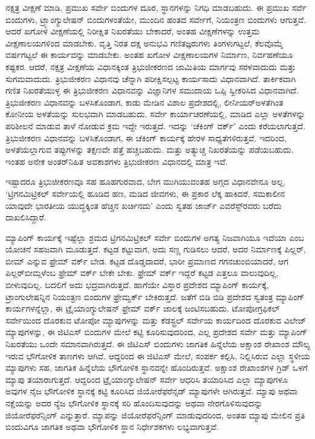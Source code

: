 ನಕ್ಷತ್ರ ವೀಕ್ಷಣೆ ಮಾಡಿ, ಪ್ರಮುಖ ಸರ್ವೇ ಬಿಂದುಗಳ ದೂರ, ಸ್ಥಾನಗಳನ್ನು ನಿಗಧಿ ಮಾಡಬಹುದು. ಈ ಪ್ರಮುಖ ಸರ್ವೆ ಬಿಂದುಗಳು, ಟ್ರ್ಯಾಂಗ್ಯುಲೇಷನ್​ ಬಿಂದುಗಳಂತೆಯೇ, ಮುಂದಿನ ಹಂತದ ಸರ್ವೇಗೆ, ನಿಯಂತ್ರಣ ಬಿಂದುಗಳು ಆಗುತ್ತವೆ. ಆದರೆ ಖಗೋಳ ವೀಕ್ಷಣೆಯಲ್ಲಿ ನಿರೀಕ್ಷಿತ ನಿಖರತೆಯು ಬೇಕಾದರೆ, ಅಂತಹ ವೀಕ್ಷಣೆಗಳನ್ನು ಉತ್ತಮ ವೀಕ್ಷಣಾಲಯಗಳಿಂದ ಮಾಡಬೇಕು. ವೃತ್ತಿ ನಿರತ ದಕ್ಷ ಅನುಭವಿ ಗಣಿತಜ್ಞರುಗಳು ತಿಂಗಳುಗಟ್ಟಲೆ, ಕೆಲವೊಮ್ಮೆ ವರ್ಷಗಟ್ಟಲೆ ಈ ಕಾರ್ಯವನ್ನು ಮಾಡಬೇಕು. ಅಂತಹ ಖಗೋಳ ವೀಕ್ಷಣಾಲಯಗಳ ನಿರ್ಮಾಣ, ನಿರ್ವಹಣೆಯೂ ಕಷ್ಟಕರ. ಆದರೆ, ನಕ್ಷತ್ರ ವೀಕ್ಷಣೆಯ ವಿಧಾನಕ್ಕಿಂತ ತ್ರಿಭುಜೀಕರಣದ ಜಾಮಿತಿಯ ಮಾರ್ಗವು ಸರಳವಾದುದು ಮತ್ತು ಸುಗಮವಾದುದು. ತ್ರಿಭುಜೀಕರಣ ವಿಧಾನವು ಚೆನ್ನಾಗಿ ಪರೀಕ್ಷಿಸಲ್ಪಟ್ಟ ಕಾರ್ಯಸಾದು ವಿಧಾನವಾಗಿದೆ. ತಾರ್ಕಿಕವಾಗಿ ಗಣಿತ ನಿಖರತೆಯುಳ್ಳ ಈ ತ್ರಿಭುಜೀಕರಣ ವಿಧಾನವನ್ನು ವಿಜ್ಞಾನಿಗಳ ಸಮುದಾಯ ಒಪ್ಪಿ ಸ್ವೀಕರಿಸಿದ ವಿಧಾನವಾಗಿದೆ. ತ್ರಿಭುಜೀಕರಣ ವಿಧಾನವನ್ನು ಬಳಸಿಕೊಂಡಾಗ, ಕಾಡು ಮೇಡಿನ ವಿಶಾಲ ಪ್ರದೇಶದಲ್ಲಿ, ಲೀನೀಯರ್​ ಅಳತೆಗಿಂತ ಕೋನೀಯ ಅಳತೆಯನ್ನು ಸುಲಭವಾಗಿ ಮಾಡಬಹುದು. ಸರ್ವೇ ಕಾರ್ಯಾಚರಣೆಯಲ್ಲಿ, ಮಾಡಿದ ಎಲ್ಲಾ ಅಳತೆಗಳನ್ನು ಪರಿಶೀಲನೆ ಮಾಡುವ ತಾಳೆ ನೋಡುವ ಕ್ರಮ ಇದ್ದೇ ಇರುತ್ತದೆ. ಇದನ್ನು ‘ಚೆಕಿಂಗ್​ ವರ್ಕ್’ ಎಂದು ಕರೆಯಲಾಗುತ್ತದೆ. ತ್ರಿಭುಜೀಕರಣ ವಿಧಾನವನ್ನು ಬಳಸಿಕೊಂಡಾಗ, ಈ ಚೆಕಿಂಗ್​ ಕಾರ್ಯಕ್ಕೆ ಹೇರಳ ಸಾಧ್ಯತೆಗಳಿರುತ್ತವೆ. ಇದರಿಂದ, ಅಳತೆಯಲ್ಲಾಗುವ ತಪ್ಪುಗಳನ್ನು ತಕ್ಷಣವೇ ಪತ್ತೆ ಹಚ್ಚಬಹುದು. ಮತ್ತು ಅತ್ಯುಚ್ಚ ನಿಖರತೆಯನ್ನು ಪಡೆಯಬಹುದು. ಇಂತಹ ಅನೇಕ ಅಂತರ್​ನಿಹಿತ ಅವಕಾಶಗಳು ತ್ರಿಭುಜೀಕರಣ ವಿಧಾನದಲ್ಲಿ ಮಾತ್ರ ಇವೆ.

\newpage

ಇಷ್ಟಾದರೂ ತ್ರಿಭುಜೀಕರಣವೂ ಸಹ ಹೂಹಗುರವಾದ, ಬೇಗ ಮುಗಿಯುವಂತಹ ಅಗ್ಗದ ವಿಧಾನವೇನೂ ಅಲ್ಲ. ‘ಟ್ರಿಗನಮಿಟ್ರಿಕಲ್​ ಸರ್ವೇಯಲ್ಲಿ ಹೂಡಿದ ಹಣ, ಮಡಿದ ಜೀವಗಳು, ಈ ಪ್ರಕಾರ ಲೆಕ್ಕ ಹಾಕಿದರೆ, ಸಮಕಾಲೀನ ಯಾವುದೇ ಭಾರತೀಯ ಯುದ್ಧಕ್ಕಿಂತ ಹೆಚ್ಚಿನ ಖರ್ಚಿನದು’ ಎಂದು ಸ್ವತಹ ಜಾರ್ಜ್ ಎವರೆಸ್ಟ್​ರವರು ಬರೆದು ದಾಖಲಿಸಿದ್ದಾರೆ.

\vskip 5pt

ಮ್ಯಾಪಿಂಗ್​ ಕಾರ್ಯಕ್ಕೆ ಇಷ್ಟೆಲ್ಲಾ ಶ್ರಮದ ಟ್ರಿಗನಮಿಟ್ರಿಕಲ್​ ಸರ್ವೇ ಬಿಂದುಗಳ ಅಗತ್ಯ ನಿಜವಾಗಿಯೂ ಇದೆಯಾ ಎಂಬ ಯೋಚನೆ ಸಹಜವಾಗಿ ಮೂಡುತ್ತದೆ. ಕಟ್ಟಡ ಕಟ್ಟುವಾಗ, ಅದು ಸಣ್ಣ ಗುಡಿಸಲು ಆದರೆ, ಅದರ ನಿರ್ಮಾಣಕ್ಕೆ ಪಿಲ್ಲರ್​, ಬೀಮ್ ಎನ್ನುವ ಫ್ರೇಮ್ ವರ್ಕ್ ಬೇಡ. ಕಟ್ಟಡ ದೊಡ್ಡದಾದರೆ, ಭಾರೀ ಪ್ರಮಾಣದ ಗಗನಚುಂಬಿಯಾದರೆ, ಆಗ ಪಿಲ್ಲರ್​ ಬೀಮ್ಗಳೆಂಬ ಫ್ರೇಮ್ ವರ್ಕ್ ಬೇಕೇ ಬೇಕು. ಫ್ರೇಮ್ ವರ್ಕ್ ಇದ್ದರೆ ಕಟ್ಟಡ ಎತ್ತಲೂ ವಾಲುವುದಿಲ್ಲ, ಬೀಳುವುದಿಲ್ಲ. ಬದಲಿಗೆ ಅದು ಭದ್ರವಾಗಿರುತ್ತದೆ. ಹಾಗೆಯೇ ವಿಸ್ತಾರ ಪ್ರದೇಶದ ಮ್ಯಾಪಿಂಗ್​ ಕಾರ್ಯಕ್ಕೆ, ಟ್ರಾಂಗುಲೇಷನ್ನಿನ ನಿಯಂತ್ರಣ ಬಿಂದುಗಳ ಫ್ರೇಮ್ವರ್ಕ್ ಬೇಕಿರುತ್ತದೆ. ಜತೆಗೆ ಬಿಡಿ ಬಿಡಿ ಪ್ರದೇಶದ ಸ್ವತಂತ್ರ ಮ್ಯಾಪಿಂಗ್​ ಕಾರ್ಯಗಳನ್ನೆಲ್ಲಾ, ಈ ಟ್ರೈಯಾಂಗ್ಯುಲೇಷನ್​ ಫ್ರೇಮ್ ವರ್ಕ್ ಜಾಲಕ್ಕೆ ಜಂಟಿಸಬಹುದು. ಟೋಪೋಗ್ರಫಿಕಲ್​ ಸರ್ವೇಯಿಂದ ದೊರಕುವ ಟೋಪೋ ಮ್ಯಾಪುಗಳನ್ನು ಮತ್ತು ಕೆಡಸ್ಟ್ರಲ್​ ಸರ್ವೇಯ ಕಾರ್ಯದಿಂದ ದೊರಕುವ ವಿಲೇಜ್​ ಮ್ಯಾಪುಗಳನ್ನು, ಈ ಜಿಟಿಎಸ್​ ಬಿಂದುಗಳ ಮೇಲೆ ಕಟ್ಟಿ ಕೂರಿಸುವುದರಿಂದ, ಎಲ್ಲ ಪ್ರದೇಶದ ಸರ್ವೇ ಮತ್ತು ಮ್ಯಾಪಿಂಗ್​ ನಿಖರತೆಯು ಒಂದೇ ಸಮಾನವಾಗಿರುತ್ತದೆ. ಈ ಜಿಟಿಎಸ್​ ಬಿಂದುಗಳು ಜಾಗತಿಕ ಹಿನ್ನೆಲೆಯ ಅಕ್ಷಾಂಶ ರೇಖಾಂಶ ಮೌಲ್ಯ ಇರುವ ಭೌಗೋಳಿಕ ತಾಣಗಳು ಆಗಿವೆ. ಆದ್ದರಿಂದ ಈ ಜಿಟಿಎಸ್​ ಮೇಲೆ, ಸಂಪರ್ಕ ಕಲ್ಪಿಸಿ, ನಿಲ್ಲಿಸಿರುವ ಎಲ್ಲಾ ಸ್ಥಳೀಯ ಮ್ಯಾಪುಗಳು ಸಹ, ಜಾಗತಿಕ ಹಿನ್ನೆಲೆಯ ಭೌಗೋಳಿಕ ಸ್ಥಾನವನ್ನೇ ಹೊಂದಿರುತ್ತವೆ. ಅಕ್ಷಾಂಶ ರೇಖಾಂಶಗಳ ಗ್ರಿಡ್​ ಒಳಗೆ ಮ್ಯಾಪು ತಯಾರಾಗುತ್ತದೆ. ಆದ್ದರಿಂದ ಟ್ರೈಯಾಂಗ್ಯುಲೇಷನ್​ ಸರ್ವೇ ಆಧರಿಸಿ ತಯಾರಿಸಿದ ಎಲ್ಲಾ ಮ್ಯಾಪುಗಳೂ ಅವುಗಳ ನೈಜ ಭೌಗೋಳಿಕ ಸ್ಥಾನಕ್ಕೆ ಕಟ್ಟಿ ಕೂರಿಸಿದ ಜಿಯೋರೆಫರೆನ್ಸಡ್​ ಮ್ಯಾಪುಗಳೇ ಆಗಿರುತ್ತವೆ. ಮ್ಯಾಪು ಅಥವಾ ನಕ್ಷೆಯನ್ನು ಅದರ ನ್ಯೆಜ ಭೌಗೋಳಿಕ ಸ್ಥಾನಕ್ಕೆ ಸರಿ ಹೊಂದಿಸುವುದನ್ನು ಅಥವಾ ನೇರಗೊಳಿಸುವುದನ್ನು ಜಿಯೋರೆಫರೆನ್ಸಿಂಗ್​ ಎನ್ನುತ್ತಾರೆ. ಮ್ಯಾಪನ್ನು ಜಿಯೋರೆಫರೆನ್ಸಿಂಗ್​ ಮಾಡುವುದರಿಂದ, ಅಂತಹ ಮ್ಯಾಪು ಮೇಲಿನ ಪ್ರತಿ ಬಿಂದುವಿಗೂ ಜಾಗತಿಕ ಅಥವಾ ಭೌಗೋಳಿಕ ಸ್ಥಾನ ನಿರ್ಧೇಶಕಗಳು ಲಭ್ಯವಾಗುತ್ತವೆ.


